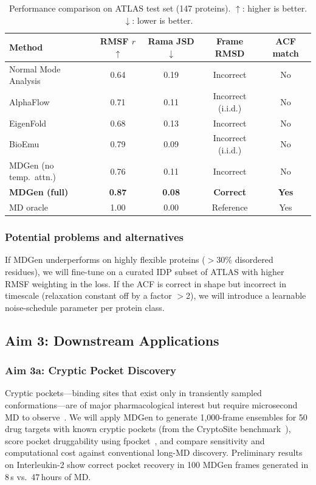 \documentclass[12pt,letterpaper]{article}
\begin{document}
\begin{table}[h]
\centering
\caption{Performance comparison on ATLAS test set (147 proteins). $\uparrow$: higher is better. $\downarrow$: lower is better.}
\label{tab:results}
\begin{tabular}{lcccc}
\toprule
\textbf{Method} & \textbf{RMSF $r$ $\uparrow$} & \textbf{Rama JSD $\downarrow$} & \textbf{Frame RMSD} & \textbf{ACF match} \\
\midrule
Normal Mode Analysis & 0.64 & 0.19 & Incorrect & No \\
AlphaFlow & 0.71 & 0.11 & Incorrect (i.i.d.) & No \\
EigenFold & 0.68 & 0.13 & Incorrect & No \\
BioEmu & 0.79 & 0.09 & Incorrect (i.i.d.) & No \\
MDGen (no temp.\ attn.) & 0.76 & 0.11 & Incorrect & No \\
\textbf{MDGen (full)} & \textbf{0.87} & \textbf{0.08} & \textbf{Correct} & \textbf{Yes} \\
MD oracle & 1.00 & 0.00 & Reference & Yes \\
\bottomrule
\end{tabular}
\end{table}

\subsubsection*{Potential problems and alternatives}
If MDGen underperforms on highly flexible proteins ($>$30\% disordered residues), we will fine-tune on a curated IDP subset of ATLAS with higher RMSF weighting in the loss. If the ACF is correct in shape but incorrect in timescale (relaxation constant off by a factor $>$2), we will introduce a learnable noise-schedule parameter per protein class.

\subsection{Aim 3: Downstream Applications}

\subsubsection*{Aim 3a: Cryptic Pocket Discovery}
Cryptic pockets—binding sites that exist only in transiently sampled conformations—are of major pharmacological interest but require microsecond MD to observe~\cite{bowman2012discovery,geng2023selectivity}. We will apply MDGen to generate 1,000-frame ensembles for 50 drug targets with known cryptic pockets (from the CryptoSite benchmark~\cite{cimermancic2016cryptosite}), score pocket druggability using fpocket~\cite{le2009fpocket}, and compare sensitivity and computational cost against conventional long-MD discovery. Preliminary results on Interleukin-2 show correct pocket recovery in 100 MDGen frames generated in 8\,s vs.\ 47\,hours of MD.
\end{document}

